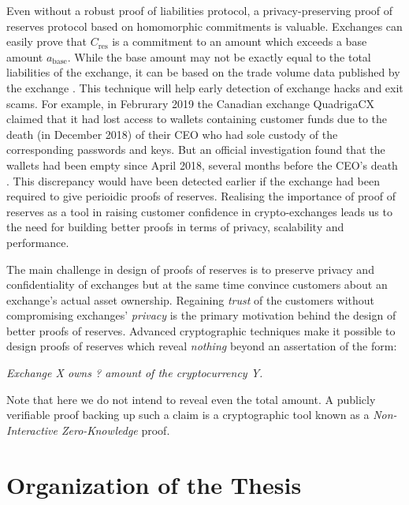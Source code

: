 Even without a robust proof of liabilities protocol, a privacy-preserving proof of reserves protocol based on homomorphic commitments is valuable. 
Exchanges can easily prove that $C_{\text{res}}$ is a commitment to an amount which exceeds a base amount $a_{\text{base}}$. While the base amount may not be exactly equal to the total liabilities of the exchange, it can be based on the trade volume data published by the exchange \cite{Coinmarketcap}. 
This technique will help early detection of exchange hacks and exit scams. 
For example, in Februrary 2019 the Canadian exchange QuadrigaCX claimed that it had lost access to wallets containing customer funds due to the death (in December 2018) of their CEO who had sole custody of the corresponding passwords and keys. But an official investigation found that the wallets had been empty since April 2018, several months before the CEO's death \cite{QuadrigaCXEmpty, EYThirdReport}. This discrepancy would have been detected earlier if the exchange had been required to give perioidic proofs of reserves.
Realising the importance of proof of reserves as a tool in raising customer confidence in crypto-exchanges leads us to the need for building better proofs in terms of privacy, scalability and performance.    

The main challenge in design of proofs of reserves is to preserve privacy and confidentiality of exchanges but at the same time convince customers about an exchange's actual asset ownership.
Regaining \textit{trust} of the customers without compromising exchanges' \textit{privacy} is the primary motivation behind the design of better proofs of reserves. 
Advanced cryptographic techniques make it possible to design proofs of reserves which reveal \textit{nothing} beyond an assertation of the form:
\begin{center}
    \textit{Exchange X owns ? amount of the cryptocurrency Y.}
\end{center}
Note that here we do not intend to reveal even the total amount. 
A publicly verifiable proof backing up such a claim is a cryptographic tool known as a \textit{Non-Interactive Zero-Knowledge} proof.

\section{Organization of the Thesis}

